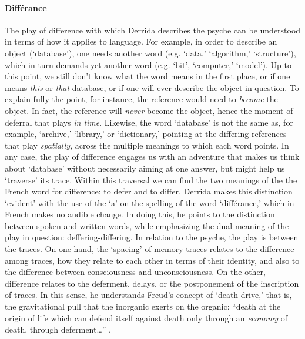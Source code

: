 \paragraph{Différance}
The play of difference with which Derrida describes the psyche can be understood in terms of how it applies to language. For example, in order to describe an object (`database'), one needs another word (e.g. `data,' `algorithm,' `structure'), which in turn demands yet another word (e.g. `bit', `computer,' `model'). Up to this point, we still don't know what the word means in the first place, or if one means \textit{this} or \textit{that} database, or if one will ever describe the object in question. To explain fully the point, for instance, the reference would need to \textit{become} the object. In fact, the reference will \textit{never} become the object, hence the moment of deferral that plays \textit{in time}. Likewise, the word `database' is not the same as, for example, `archive,' `library,' or `dictionary,' pointing at the differing references that play \textit{spatially}, across the multiple meanings to which each word points. In any case, the play of difference engages us with an adventure that makes us think about `database' without necessarily aiming at one answer, but might help us `traverse' its trace. Within this traversal we can find the two meanings of the the French word for difference: to defer and to differ. Derrida makes this distinction `evident' with the use of the `a' on the spelling of the word `différance,' which in French makes no audible change. In doing this, he points to the distinction between spoken and written words, while emphasizing the dual meaning of the play in question: deffering-differing. In relation to the psyche, the play is between the traces. On one hand, the `spacing' of memory traces relates to the difference among traces, how they relate to each other in terms of their identity, and also to the difference between consciousness and unconsciousness. On the other, difference relates to the deferment, delays, or the postponement of the inscription of traces. In this sense, he understands Freud's concept of `death drive,' that is, the gravitational pull that the inorganic exerts on the organic: ``death at the origin of life which can defend itself against death only through an \textit{economy} of death, through deferment\dots'' \parencite[202]{Der78:Wri}.

